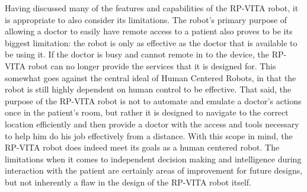 \documentclass[11pt,conference]{IEEEtran}
\begin{document}
\indent Having discussed many of the features and capabilities of the RP-VITA robot, it is appropriate to also consider its limitations. The robot's primary purpose of allowing a doctor to easily have remote access to a patient also proves to be its biggest limitation: the robot is only as effective as the doctor that is available to be using it. If the doctor is busy and cannot remote in to the device, the RP-VITA robot can no longer provide the services that it is designed for. This somewhat goes against the central ideal of Human Centered Robots, in that the robot is still highly dependent on human control to be effective. That said, the purpose of the RP-VITA robot is not to automate and emulate a doctor's actions once in the patient's room, but rather it is designed to navigate to the correct location efficiently and then provide a doctor with the access and tools necessary to help him do his job effectively from a distance. With this scope in mind, the RP-VITA robot does indeed meet its goals as a human centered robot. The limitations when it comes to independent decision making and intelligence during interaction with the patient are certainly areas of improvement for future designs, but not inherently a flaw in the design of the RP-VITA robot itself.
\end{document}
